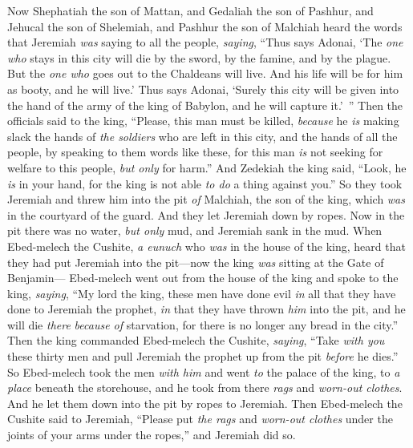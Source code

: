 \begin{biblechapter} %
 Now Shephatiah the son of Mattan, and Gedaliah the son of Pashhur, and Jehucal the son of Shelemiah, and Pashhur the son of Malchiah heard the words that Jeremiah \textit{was} saying to all the people, \textit{saying},
\verse “Thus says Adonai, ‘The \textit{one who} stays in this city will die by the sword, by the famine, and by the plague. But the \textit{one who} goes out to the Chaldeans will live. And his life will be for him as booty, and he will live.’
\verse Thus says Adonai, ‘Surely this city will be given into the hand of the army of the king of Babylon, and he will capture it.’ ”
\verse Then the officials said to the king, “Please, this man must be killed, \textit{because} he \textit{is} making slack the hands of \textit{the soldiers} who are left in this city, and the hands of all the people, by speaking to them words like these, for this man \textit{is} not seeking for welfare to this people, \textit{but only} for harm.”
\verse And Zedekiah the king said, “Look, he \textit{is} in your hand, for the king is not able \textit{to do} a thing against you.”
\verse So they took Jeremiah and threw him into the pit \textit{of} Malchiah, the son of the king, which \textit{was} in the courtyard of the guard. And they let Jeremiah down by ropes. Now in the pit there was no water, \textit{but only} mud, and Jeremiah sank in the mud.
\verse When Ebed-melech the Cushite, \textit{a eunuch} who \textit{was} in the house of the king, heard that they had put Jeremiah into the pit—now the king \textit{was} sitting at the Gate of Benjamin—
\verse Ebed-melech went out from the house of the king and spoke to the king, \textit{saying},
\verse “My lord the king, these men have done evil \textit{in} all that they have done to Jeremiah the prophet, \textit{in} that they have thrown \textit{him} into the pit, and he will die \textit{there} \textit{because of} starvation, for there is no longer any bread in the city.”
\verse Then the king commanded Ebed-melech the Cushite, \textit{saying}, “Take \textit{with you} these thirty men and pull Jeremiah the prophet up from the pit \textit{before} he dies.”
\verse So Ebed-melech took the men \textit{with him} and went \textit{to} the palace of the king, to \textit{a place} beneath the storehouse, and he took from there \textit{rags} and \textit{worn-out clothes}. And he let them down into the pit by ropes to Jeremiah.
\verse Then Ebed-melech the Cushite said to Jeremiah, “Please put \textit{the rags} and \textit{worn-out clothes} under the joints of your arms under the ropes,” and Jeremiah did so.

\end{biblechapter}
